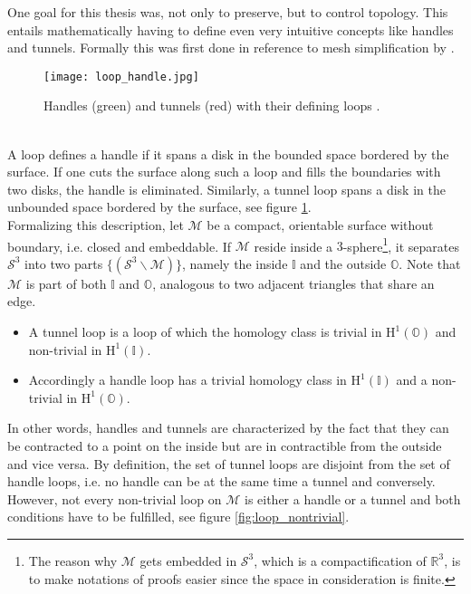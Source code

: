One goal for this thesis was, not only to preserve, but to control topology.
This entails mathematically having to define even very intuitive concepts like handles and tunnels.
Formally this was first done in reference to mesh simplification by \citep[][]{Dey2007}.
\begin{figure}[htb]
\centering
\texttt{[image: loop\_handle.jpg]}
\caption{Handles (green) and tunnels (red) with their defining loops \citep[][]{Dey2012}.}
\label{fig:loop_handle}
\end{figure}\\
A loop defines a handle if it spans a disk in the bounded space bordered by the surface.
If one cuts the surface along such a loop and fills the boundaries with two disks, the handle is eliminated.
Similarly, a tunnel loop spans a disk in the unbounded space bordered by the surface, see figure \ref{fig:loop_handle}.\\
Formalizing this description, let $\mathcal{M}$ be a compact, orientable surface without boundary, i.e. closed and embeddable.
If $\mathcal{M}$ reside inside a $3$-sphere\footnote{ The reason why $\mathcal{M}$ gets embedded in $\mathcal{S}^{3}$, which is a compactification of $\mathbb{R}^{3}$, is to make notations of proofs easier since the space in consideration is finite.}, it separates $\mathcal{S}^{3}$ into two parts $\{(\mathcal{S}^{3} \backslash \mathcal{M})\}$, namely the inside $\mathbb{I}$ and the outside $\mathbb{O}$.
Note that $\mathcal{M}$ is part of both $\mathbb{I}$ and $\mathbb{O}$, analogous to two adjacent triangles that share an edge.
\begin{itemize}
\setlength{\itemsep}{0cm}
\setlength{\parskip}{0cm}
	\item A tunnel loop is a loop of which the homology class is trivial in $\mathrm{H}^{1}(\mathbb{O})$ and non-trivial in $\mathrm{H}^{1}(\mathbb{I})$.
	\item Accordingly a handle loop has a trivial homology class in $\mathrm{H}^{1}(\mathbb{I})$ and a non-trivial in $\mathrm{H}^{1}(\mathbb{O})$.
\end{itemize}

In other words, handles and tunnels are characterized by the fact that they can be contracted to a point on the inside but are in contractible from the outside and vice versa.
By definition, the set of tunnel loops are disjoint from the set of handle loops, i.e. no handle can be at the same time a tunnel and conversely.
However, not every non-trivial loop on $\mathcal{M}$ is either a handle or a tunnel and both conditions have to be fulfilled, see figure \ref{fig:loop_nontrivial}.

